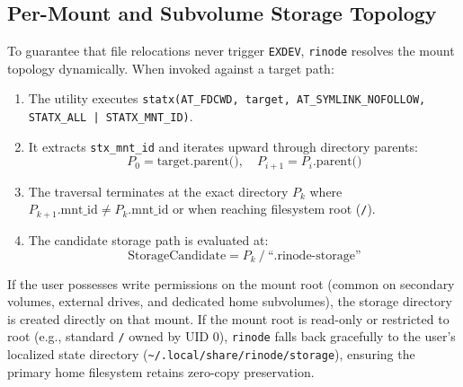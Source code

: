 \documentclass[11pt,a4paper]{article}
\begin{document}
\subsection{Per-Mount and Subvolume Storage Topology}
To guarantee that file relocations never trigger \texttt{EXDEV}, \texttt{rinode} resolves the mount topology dynamically. When invoked against a target path:
\begin{enumerate}[leftmargin=1.5em]
    \item The utility executes \texttt{statx(AT\_FDCWD, target, AT\_SYMLINK\_NOFOLLOW, STATX\_ALL | STATX\_MNT\_ID)}.
    \item It extracts \texttt{stx\_mnt\_id} and iterates upward through directory parents:
    \begin{equation}
        P_0 = \text{target.parent()}, \quad P_{i+1} = P_i\text{.parent()}
    \end{equation}
    \item The traversal terminates at the exact directory $P_k$ where $P_{k+1}\text{.mnt\_id} \neq P_k\text{.mnt\_id}$ or when reaching filesystem root (\texttt{/}).
    \item The candidate storage path is evaluated at:
    \begin{equation}
        \text{StorageCandidate} = P_k \mathbin{/} \text{``.rinode-storage''}
    \end{equation}
\end{enumerate}

If the user possesses write permissions on the mount root (common on secondary volumes, external drives, and dedicated home subvolumes), the storage directory is created directly on that mount. If the mount root is read-only or restricted to root (e.g., standard \texttt{/} owned by UID 0), \texttt{rinode} falls back gracefully to the user's localized state directory (\texttt{\~{}/.local/share/rinode/storage}), ensuring the primary home filesystem retains zero-copy preservation.
\end{document}
